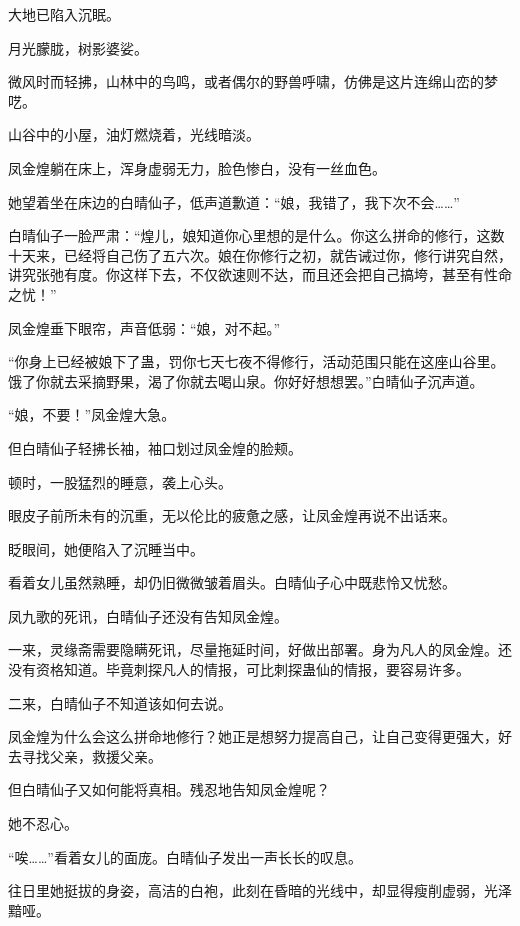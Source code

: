 
\begin{this_body}



大地已陷入沉眠。

月光朦胧，树影婆娑。

微风时而轻拂，山林中的鸟鸣，或者偶尔的野兽呼啸，仿佛是这片连绵山峦的梦呓。

山谷中的小屋，油灯燃烧着，光线暗淡。

凤金煌躺在床上，浑身虚弱无力，脸色惨白，没有一丝血色。

她望着坐在床边的白晴仙子，低声道歉道：“娘，我错了，我下次不会……”

白晴仙子一脸严肃：“煌儿，娘知道你心里想的是什么。你这么拼命的修行，这数十天来，已经将自己伤了五六次。娘在你修行之初，就告诫过你，修行讲究自然，讲究张弛有度。你这样下去，不仅欲速则不达，而且还会把自己搞垮，甚至有性命之忧！”

凤金煌垂下眼帘，声音低弱：“娘，对不起。”

“你身上已经被娘下了蛊，罚你七天七夜不得修行，活动范围只能在这座山谷里。饿了你就去采摘野果，渴了你就去喝山泉。你好好想想罢。”白晴仙子沉声道。

“娘，不要！”凤金煌大急。

但白晴仙子轻拂长袖，袖口划过凤金煌的脸颊。

顿时，一股猛烈的睡意，袭上心头。

眼皮子前所未有的沉重，无以伦比的疲惫之感，让凤金煌再说不出话来。

眨眼间，她便陷入了沉睡当中。

看着女儿虽然熟睡，却仍旧微微皱着眉头。白晴仙子心中既悲怜又忧愁。

凤九歌的死讯，白晴仙子还没有告知凤金煌。

一来，灵缘斋需要隐瞒死讯，尽量拖延时间，好做出部署。身为凡人的凤金煌。还没有资格知道。毕竟刺探凡人的情报，可比刺探蛊仙的情报，要容易许多。

二来，白晴仙子不知道该如何去说。

凤金煌为什么会这么拼命地修行？她正是想努力提高自己，让自己变得更强大，好去寻找父亲，救援父亲。

但白晴仙子又如何能将真相。残忍地告知凤金煌呢？

她不忍心。

“唉……”看着女儿的面庞。白晴仙子发出一声长长的叹息。

往日里她挺拔的身姿，高洁的白袍，此刻在昏暗的光线中，却显得瘦削虚弱，光泽黯哑。


\end{this_body}
